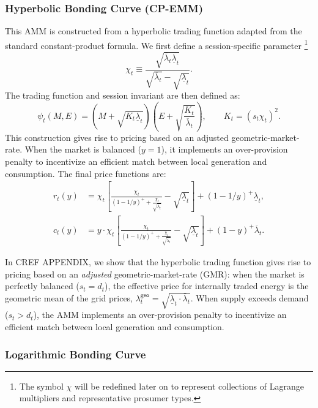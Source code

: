 \documentclass[12pt, notitlepage]{article}
\begin{document}
\subsubsection*{Hyperbolic Bonding Curve (CP-EMM)}
This AMM is constructed from a hyperbolic trading function adapted from the standard constant-product formula. We first define a session-specific parameter \footnote{The symbol $\chi$ will be redefined later on to represent collections of Lagrange multipliers and representative prosumer types.}$$\chi_t \equiv \frac{\sqrt{\overline{\lambda}_t \underline{\lambda}_t}}{\sqrt{\overline{\lambda}_t} - \sqrt{\underline{\lambda}_t}}.$$The trading function and session invariant are then defined as:
\begin{equation}
   \psi_t(M,E) = \left(M +  \sqrt{ K_t  \underline{\lambda}_t}\right) \left(E + \sqrt{ \frac{K_t}{\overline{\lambda}_t} }\right), \qquad K_t = (s_t \chi_t)^2.
\end{equation}
This construction gives rise to pricing based on an adjusted geometric-market-rate. When the market is balanced ($y=1$), it implements an over-provision penalty to incentivize an efficient match between local generation and consumption. The final price functions are:
\begin{align}
r_t(y) &= \chi_t \left[ \frac{\chi_t}{(1 - 1/y)^+ + \frac{\chi_t}{\sqrt{\overline{\lambda}_t}}} - \sqrt{\underline{\lambda}_t} \right] + (1 - 1/y)^+ \underline{\lambda}_t, \\[12pt]
c_t(y) &= y \cdot \chi_t \left[ \frac{\chi_t}{(1 - 1/y)^+ + \frac{\chi_t}{\sqrt{\overline{\lambda}_t}}} - \sqrt{\underline{\lambda}_t} \right] + (1 - y)^+ \overline{\lambda}_t.
\end{align}

In CREF APPENDIX, we show that the hyperbolic trading function gives rise to pricing based on an \textit{adjusted} geometric-market-rate (GMR): when the market is perfectly balanced ($s_t = d_t$), the effective price for internally traded energy is the geometric mean of the grid prices, $\lambda_t^{\textsf{geo}} = \sqrt{\underline{\lambda}_t \cdot \bar{\lambda}_t }$. When supply exceeds demand ($s_t > d_t$), the AMM implements an over-provision penalty to incentivize an efficient match between local generation and consumption. 

\subsubsection*{Logarithmic Bonding Curve}
\end{document}
